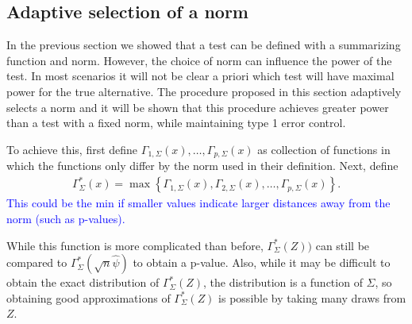 \documentclass{article}
\newcommand{\vmat}{\Sigma}
\newcommand{\norm}{f}
\newcommand{\rvv}{Z}
\begin{document}

\subsection{Adaptive selection of a norm}
In the previous section we showed that a test can be defined with a summarizing function and norm. However, the choice of norm can influence the power of the test. In most scenarios it will not be clear a priori which test will have maximal power for the true alternative. The procedure proposed in this section adaptively selects a norm and it will be shown that this procedure achieves greater power than a test with a fixed norm, while maintaining type 1 error control.  

To achieve this, first define $\Gamma_{1, \vmat}(x), \dots, \Gamma_{p, \vmat}(x)$ as collection of functions in which the functions only differ by the norm used in their definition. Next, define
\begin{align*}
	\Gamma^*_\vmat(x) = \max\left\{\Gamma_{1, \vmat}(x), \Gamma_{2, \vmat}(x), \dots, \Gamma_{p, \vmat}(x)\right\}.
\end{align*}
\textcolor{blue}{This could be the min if smaller values indicate larger distances away from the norm (such as p-values).}  

While this function is more complicated than before,  $\Gamma^*_{\vmat}(\rvv))$ can still be compared to $\Gamma^*_{\vmat}(\sqrt{n}\hat{\psi})$ to obtain a p-value. Also, while it may be difficult to obtain the exact distribution of $\Gamma_\vmat^*(\rvv)$, the distribution is a function of $\vmat$, so obtaining good approximations of $\Gamma_\vmat^*(\rvv)$ is possible by taking many draws from $\rvv$.
\end{document}
